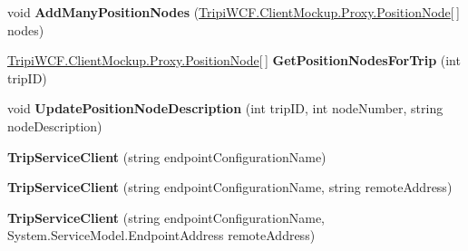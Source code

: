 \begin{DoxyCompactItemize}
\item 
\hypertarget{class_tripi_w_c_f_1_1_client_mockup_1_1_proxy_1_1_trip_service_client_ae4e1deb0bd4735dbe9bd467ad8654638}{
void {\bfseries AddManyPositionNodes} (\hyperlink{class_tripi_w_c_f_1_1_client_mockup_1_1_proxy_1_1_position_node}{TripiWCF.ClientMockup.Proxy.PositionNode}\mbox{[}$\,$\mbox{]} nodes)}
\label{class_tripi_w_c_f_1_1_client_mockup_1_1_proxy_1_1_trip_service_client_ae4e1deb0bd4735dbe9bd467ad8654638}

\item 
\hypertarget{class_tripi_w_c_f_1_1_client_mockup_1_1_proxy_1_1_trip_service_client_a0568d2d0f9aabc3ffd752b7bb7be3a16}{
\hyperlink{class_tripi_w_c_f_1_1_client_mockup_1_1_proxy_1_1_position_node}{TripiWCF.ClientMockup.Proxy.PositionNode}\mbox{[}$\,$\mbox{]} {\bfseries GetPositionNodesForTrip} (int tripID)}
\label{class_tripi_w_c_f_1_1_client_mockup_1_1_proxy_1_1_trip_service_client_a0568d2d0f9aabc3ffd752b7bb7be3a16}

\item 
\hypertarget{class_tripi_w_c_f_1_1_client_mockup_1_1_proxy_1_1_trip_service_client_a4825d8b420f6ddcab725bb2de094771f}{
void {\bfseries UpdatePositionNodeDescription} (int tripID, int nodeNumber, string nodeDescription)}
\label{class_tripi_w_c_f_1_1_client_mockup_1_1_proxy_1_1_trip_service_client_a4825d8b420f6ddcab725bb2de094771f}

\item 
\hypertarget{class_tripi_w_c_f_1_1_client_mockup_1_1_proxy_1_1_trip_service_client_adf574734d8750881f921ee69cf9a5631}{
{\bfseries TripServiceClient} (string endpointConfigurationName)}
\label{class_tripi_w_c_f_1_1_client_mockup_1_1_proxy_1_1_trip_service_client_adf574734d8750881f921ee69cf9a5631}

\item 
\hypertarget{class_tripi_w_c_f_1_1_client_mockup_1_1_proxy_1_1_trip_service_client_a8df5f565af8eaa4ef0a483e5ec2c0a87}{
{\bfseries TripServiceClient} (string endpointConfigurationName, string remoteAddress)}
\label{class_tripi_w_c_f_1_1_client_mockup_1_1_proxy_1_1_trip_service_client_a8df5f565af8eaa4ef0a483e5ec2c0a87}

\item 
\hypertarget{class_tripi_w_c_f_1_1_client_mockup_1_1_proxy_1_1_trip_service_client_a3d73a69c2c051af7d07455ebd01c553b}{
{\bfseries TripServiceClient} (string endpointConfigurationName, System.ServiceModel.EndpointAddress remoteAddress)}
\label{class_tripi_w_c_f_1_1_client_mockup_1_1_proxy_1_1_trip_service_client_a3d73a69c2c051af7d07455ebd01c553b}


\end{DoxyCompactItemize}
